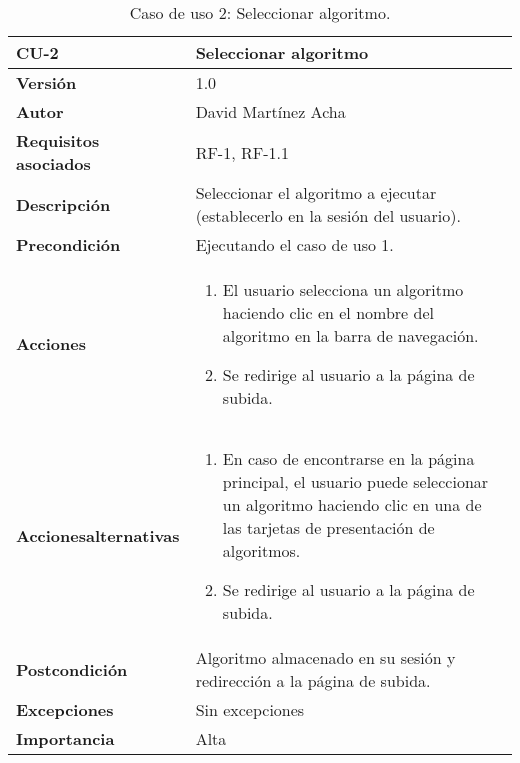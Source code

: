 \begin{table}[p]
	\centering
	\begin{tabularx}{\linewidth}{ p{} p{} }
		\toprule
		\textbf{CU-2}    & \textbf{Seleccionar algoritmo}\\
		\toprule
		\textbf{Versión}              & 1.0    \\
		\textbf{Autor}                & David Martínez Acha \\
		\textbf{Requisitos asociados} & RF-1, RF-1.1 \\
		\textbf{Descripción}          & Seleccionar el algoritmo a ejecutar (establecerlo en la sesión del usuario). \\
		\textbf{Precondición}         & Ejecutando el caso de uso 1. \\
		\textbf{Acciones}             &
		\begin{enumerate}
			\def\labelenumi{\arabic{enumi}.}
			\tightlist
			\item El usuario selecciona un algoritmo haciendo clic en el nombre del algoritmo en la barra de navegación.
			\item Se redirige al usuario a la página de subida.
		\end{enumerate}\\
        \textbf{Acciones\newline alternativas}&
		\begin{enumerate}
			\def\labelenumi{\arabic{enumi}.}
			\tightlist
			\item En caso de encontrarse en la página principal, el usuario
		puede seleccionar un algoritmo haciendo clic en una de las tarjetas de
		presentación de algoritmos.
			\item Se redirige al usuario a la página de subida. \end{enumerate}\\
		\textbf{Postcondición}        & Algoritmo almacenado en su sesión y redirección a la página de subida. \\
		\textbf{Excepciones}          & Sin excepciones \\
		\textbf{Importancia}          & Alta \\
		\bottomrule
	\end{tabularx}
	\caption{Caso de uso 2: Seleccionar algoritmo.}
\end{table}

